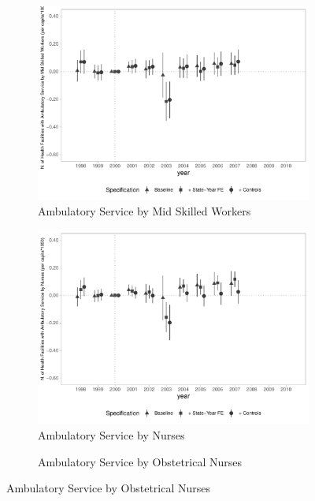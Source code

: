 \begin{figure}[h]
\begin{center}
\begin{subfigure}{0.24\textwidth}
        \centering
        \caption{\tiny Ambulatory Service by Mid Skilled Workers}\label{fig:infra_e}
        \includegraphics[width=\textwidth]{plots/infra/sia_ncnes_med_skill_mun_pcapita_dist_ec29_baseline_dist_ec29_baseline_full.pdf}
    \end{subfigure}
    \begin{subfigure}{0.24\textwidth}
        \centering
        \caption{\tiny Ambulatory Service by Nurses}\label{fig:infra_f}
        \includegraphics[width=\textwidth]{plots/infra/sia_ncnes_enf_mun_pcapita_dist_ec29_baseline_dist_ec29_baseline_full.pdf}
    \end{subfigure}
    \begin{subfigure}{0.24\textwidth}
        \centering
        \caption{\tiny Ambulatory Service by Obstetrical Nurses}\label{fig:infra_g}

\end{subfigure}
\end{center}
\end{figure}
